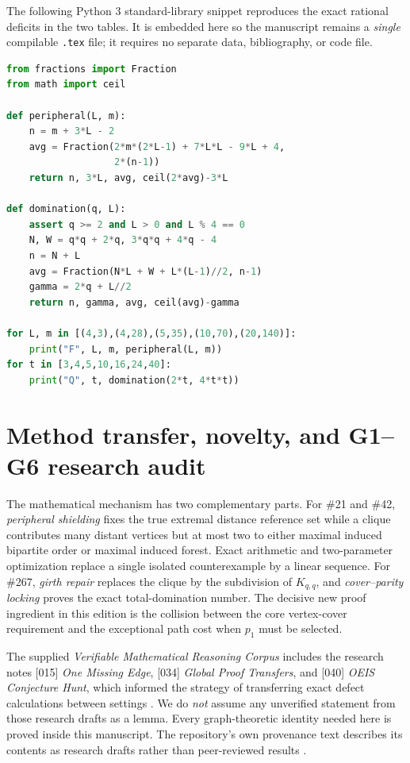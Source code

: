 \documentclass[11pt,a4paper]{article}
\theoremstyle{definition}
\theoremstyle{remark}
\begin{document}
The following Python 3 standard-library snippet reproduces the exact rational deficits in the two tables. It is embedded here so the manuscript remains a \emph{single} compilable \texttt{.tex} file; it requires no separate data, bibliography, or code file.
\begin{lstlisting}[style=pcode,language=Python]
from fractions import Fraction
from math import ceil

def peripheral(L, m):
    n = m + 3*L - 2
    avg = Fraction(2*m*(2*L-1) + 7*L*L - 9*L + 4,
                   2*(n-1))
    return n, 3*L, avg, ceil(2*avg)-3*L

def domination(q, L):
    assert q >= 2 and L > 0 and L % 4 == 0
    N, W = q*q + 2*q, 3*q*q + 4*q - 4
    n = N + L
    avg = Fraction(N*L + W + L*(L-1)//2, n-1)
    gamma = 2*q + L//2
    return n, gamma, avg, ceil(avg)-gamma

for L, m in [(4,3),(4,28),(5,35),(10,70),(20,140)]:
    print("F", L, m, peripheral(L, m))
for t in [3,4,5,10,16,24,40]:
    print("Q", t, domination(2*t, 4*t*t))
\end{lstlisting}

\section{Method transfer, novelty, and G1--G6 research audit}
The mathematical mechanism has two complementary parts. For \#21 and \#42, \emph{peripheral shielding} fixes the true extremal distance reference set while a clique contributes many distant vertices but at most two to either maximal induced bipartite order or maximal induced forest. Exact arithmetic and two-parameter optimization replace a single isolated counterexample by a linear sequence. For \#267, \emph{girth repair} replaces the clique by the subdivision of $K_{q,q}$, and \emph{cover--parity locking} proves the exact total-domination number. The decisive new proof ingredient in this edition is the collision between the core vertex-cover requirement and the exceptional path cost when $p_1$ must be selected.

The supplied \emph{Verifiable Mathematical Reasoning Corpus} includes the research notes [015] \emph{One Missing Edge}, [034] \emph{Global Proof Transfers}, and [040] \emph{OEIS Conjecture Hunt}, which informed the strategy of transferring exact defect calculations between settings \cite{corpus}. We do \emph{not} assume any unverified statement from those research drafts as a lemma. Every graph-theoretic identity needed here is proved inside this manuscript. The repository's own provenance text describes its contents as research drafts rather than peer-reviewed results \cite{corpus}.
\end{document}
